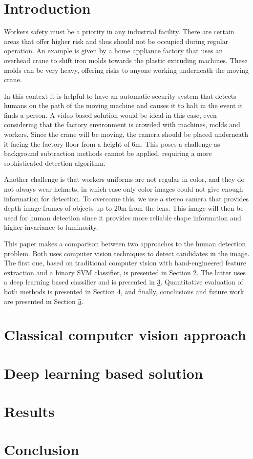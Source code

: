\section{Introduction}
Workers safety must be a priority in any industrial facility. There are certain areas that offer higher risk and thus should not be occupied during regular operation. An example is given by a home appliance factory that uses an overhead crane to shift iron molds towards the plastic extruding machines. These molds can be very heavy, offering risks to anyone working underneath the moving crane.

In this context it is helpful to have an automatic security system that detects humans on the path of the moving machine and causes it to halt in the event it finds a person. A video based solution would be ideal in this case, even considering that the factory environment is crowded with machines, molds and workers. Since the crane will be moving, the camera should be placed underneath it facing the factory floor from a height of 6m. This poses a challenge as background subtraction methods cannot be applied, requiring a more sophisticated detection algorithm.

Another challenge is that workers uniforms are not regular in color, and they do not always wear helmets, in which case only color images could not give enough information for detection. To overcome this, we use a stereo camera that provides depth image frames of objects up to 20m from the lens. This image will then be used for human detection since it provides more reliable shape information and higher invariance to luminosity.

This paper makes a comparison between two approaches to the human detection problem. Both uses computer vision techniques to detect candidates in the image. The first one, based on traditional computer vision with hand-engineered feature extraction and a binary SVM classifier, is presented in Section \ref{sec:classical}. The latter uses a deep learning based classifier and is presented in \ref{sec:deep}. Quantitative evaluation of both methods is presented in Section \ref{sec:results}, and finally, conclusions and future work are presented in Section \ref{sec:conclusion}.

\section{Classical computer vision approach}
\label{sec:classical}

\section{Deep learning based solution}
\label{sec:deep}

\section{Results}
\label{sec:results}

\section{Conclusion}
\label{sec:conclusion}
